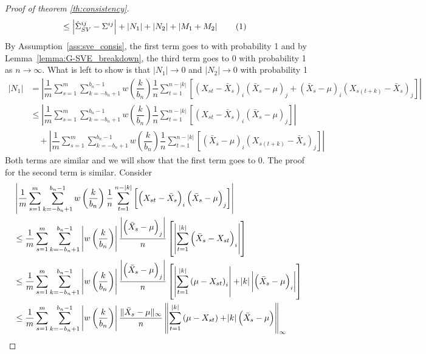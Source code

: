 \documentclass[11pt]{article}
\newcommand\numberthis{\addtocounter{equation}{1}\tag{\theequation}}
\theoremstyle{remark}
\begin{document}
\begin{proof}[Proof of theorem \ref{th:consistency}]
\begin{align*}
& \leq \left| \hat{\Sigma}_{SV}^{ij} - \Sigma^{ij} \right| +  \left| N_1 \right| +  \left|N_2 \right| + \left| M_1 + M_2 \right| \numberthis \label{eq:G-SVE_full_decomp}
\end{align*}
%
By Assumption~\ref{ass:sve_consis}, the first term goes to with probability 1 and by Lemma~\ref{lemma:G-SVE_breakdown}, the third term goes to 0 with probability 1 as $n \to \infty$. What is left to show is that $|N_1| \to 0$ and $|N_2| \to 0$ with probability 1
%
\begin{align*}
|N_1| & = \left|\dfrac{1}{m}\sum_{s=1}^{m}  \sum_{k=-b_n+1}^{b_n-1}  w\left(\dfrac{k}{b_n}\right)\dfrac{1}{n}  \sum_{t=1}^{n-|k|}  \left[ \left(X_{st} - \bar{X}_s \right)_i  \left(\bar{X}_s - \mu \right)_j + \left(\bar{X}_s - \mu \right)_i  \left(X_{s(t+k)} - \bar{X}_s \right)_j\right] \right|\\
& \leq \left| \dfrac{1}{m}\sum_{s=1}^{m}\sum_{k=-b_n+1}^{b_n-1}w\left(\dfrac{k}{b_n}\right)\dfrac{1}{n}\sum_{t=1}^{n-|k|}\left[ \left(X_{st} - \bar{X}_s \right)_i  \left(\bar{X}_s - \mu \right)_j \right] \right| \\ 
& \quad + \left| \dfrac{1}{m}\sum_{s=1}^{m}\sum_{k=-b_n+1}^{b_n-1}w\left(\dfrac{k}{b_n}\right)\dfrac{1}{n}\sum_{t=1}^{n-|k|}\left[ \left(\bar{X}_s - \mu \right)_i  \left(X_{s(t+k)} - \bar{X}_s \right)_j\right] \right|
\end{align*}
%
Both terms are similar and we will show that the first term goes to 0. The proof for the second term is similar. Consider
\begin{align*}
    & \left| \dfrac{1}{m}\sum_{s=1}^{m}\sum_{k=-b_n+1}^{b_n-1}w\left(\dfrac{k}{b_n}\right)\dfrac{1}{n}\sum_{t=1}^{n-|k|}\left[ \left(X_{st} - \bar{X}_s \right)_i  \left(\bar{X}_s - \mu \right)_j \right] \right| \\
    & \leq \dfrac{1}{m}\sum_{s=1}^{m}\sum_{k=-b_n+1}^{b_n-1}  \left|w\left(\dfrac{k}{b_n}\right)  \right|\dfrac{  \left| \left(\bar{X}_s - \mu \right)_j \right| }{n} \left[ \left|  \sum_{t=1}^{|k|} \left(\bar{X}_s - X_{st} \right)_i  \right| \right]\\
    & \leq \dfrac{1}{m}\sum_{s=1}^{m}\sum_{k=-b_n+1}^{b_n-1} \left| w\left(\dfrac{k}{b_n}\right) \right| \dfrac{ \left|  \left(\bar{X}_s - \mu \right)_j \right| }{n} \left[ \left|\sum_{t=1}^{|k|} \left(\mu - X_{st} \right)_i \right| + \abs{k} \left|\left(\bar{X}_s - \mu \right)_i \right|\right]\\
    & \leq \dfrac{1}{m}\sum_{s=1}^{m}\sum_{k=-b_n+1}^{b_n-1}  \left|w\left(\dfrac{k}{b_n}\right) \right|\dfrac{\|\bar{X}_s - \mu\|_{\infty}}{n} \left\|\sum_{t=1}^{|k|} \left(\mu - X_{st} \right) + \abs{k} \left(\bar{X}_s - \mu \right)\right\|_{\infty}\\

\end{align*}
\end{proof}
\end{document}
